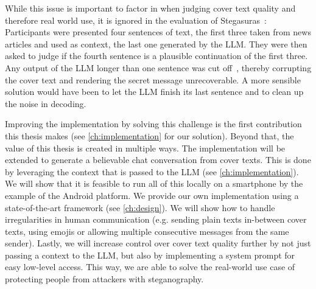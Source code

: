 While this issue is important to factor in when judging cover text quality and therefore real world use, it is ignored in the evaluation of Stegasuras~\cite{zieglerNeuralLinguisticSteganography2019}: Participants were presented four sentences of text, the first three taken from news articles and used as context, the last one generated by the \gls{LLM}. They were then asked to judge if the fourth sentence is a plausible continuation of the first three. Any output of the \gls{LLM} longer than one sentence was cut off~\cite{zieglerNeuralLinguisticSteganography2019}, thereby corrupting the cover text and rendering the secret message unrecoverable. A more sensible solution would have been to let the \gls{LLM} finish its last sentence and to clean up the noise in decoding.

Improving the implementation by solving this challenge is the first contribution this thesis makes (see \cref{ch:implementation} for our solution). Beyond that, the value of this thesis is created in multiple ways. The implementation will be extended to generate a believable chat conversation from cover texts. This is done by leveraging the context that is passed to the \gls{LLM} (see \cref{ch:implementation}). We will show that it is feasible to run all of this locally on a smartphone by the example of the Android platform. We provide our own implementation using a state-of-the-art framework (see \cref{ch:design}). We will show how to handle irregularities in human communication (e.g. sending plain texts in-between cover texts, using emojis or allowing multiple consecutive messages from the same sender). Lastly, we will increase control over cover text quality further by not just passing a context to the \gls{LLM}, but also by implementing a system prompt for easy low-level access. This way, we are able to solve the real-world use case of protecting people from attackers with steganography.
